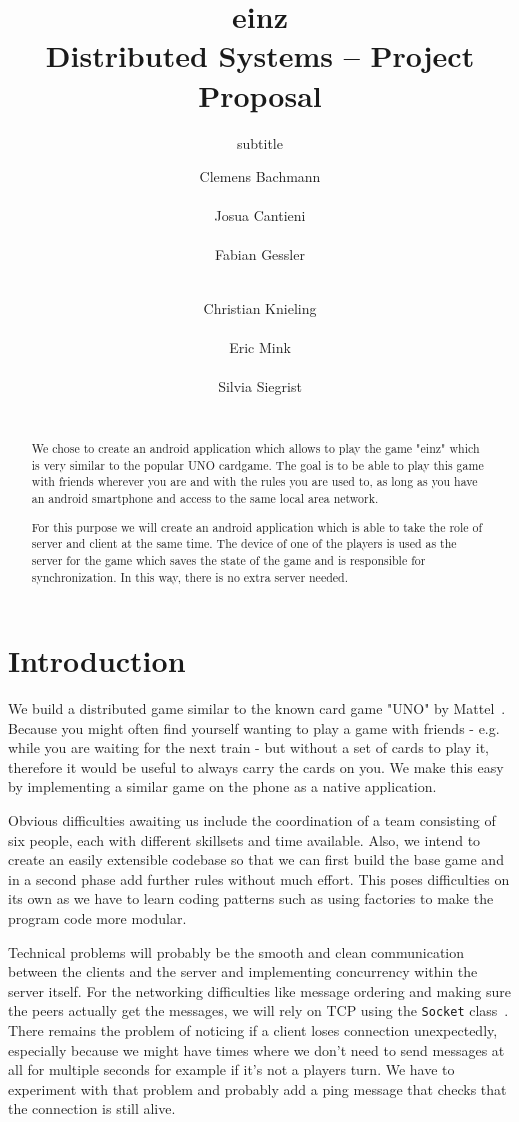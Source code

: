 \documentclass{sig-alternate}
\title{einz\\
\normalsize{Distributed Systems -- Project Proposal}}
\subtitle{subtitle}
\author{
\alignauthor
\normalsize{Clemens Bachmann}\\
	\affaddr{\normalsize{13-932-488}}\\
	\email{\normalsize{baclemen@student.ethz.ch}}
%
\alignauthor
\normalsize{Josua Cantieni}\\
	\affaddr{\normalsize{15-919-038}}\\
	\email{\normalsize{josuac@student.ethz.ch}}
%
\alignauthor
\normalsize{Fabian Gessler}\\
	\affaddr{\normalsize{15-939-341}}\\
	\email{\normalsize{fgessler@student.ethz.ch}}
\and
\alignauthor
\normalsize{Christian Knieling}\\
	\affaddr{\normalsize{ 14-923-809}}\\
	\email{\normalsize{knielinc@student.ethz.ch}}
%
\alignauthor
\normalsize{Eric Mink}\\
	\affaddr{\normalsize{15-917-057}}\\
	\email{\normalsize{minker@student.ethz.ch}}
%
\alignauthor
\normalsize{Silvia Siegrist}\\
	\affaddr{\normalsize{15-935-893}}\\
	\email{\normalsize{sisilvia@student.ethz.ch}}
}
\begin{document}
\maketitle

\begin{abstract}
We chose to create an android application which allows to play the game "einz" which is very similar to the popular UNO cardgame. The goal is to be able to play this game with friends wherever you are and with the rules you are used to, as long as you have an android smartphone and access to the same local area network.

For this purpose we will create an android application which is able to take the role of server and client at the same time. The device of one of the players is used as the server for the game which saves the state of the game and is responsible for synchronization. In this way, there is no extra server needed.
\end{abstract}

\section{Introduction}
We build a distributed game similar to the known card game "UNO" by Mattel~\cite{unoshop}. Because you might often find yourself wanting to play a game with friends - e.g. while you are waiting for the next train - but without a set of cards to play it, therefore it would be useful to always carry the cards on you. We make this easy by implementing a similar game on the phone as a native application.

Obvious difficulties awaiting us include the coordination of a team consisting of six people, each with different skillsets and time available.
Also, we intend to create an easily extensible codebase so that we can first build the base game and in a second phase add further rules without much effort. This poses difficulties on its own as we have to learn coding patterns such as using factories to make the program code more modular.

Technical problems will probably be the smooth and clean communication between the clients and the server and implementing concurrency within the server itself. For the networking difficulties like message ordering and making sure the peers actually get the messages, we will rely on TCP using the \verb|Socket| class~\cite{socketdoc}. There remains the problem of noticing if a client loses connection unexpectedly, especially because we might have times where we don't need to send messages at all for multiple seconds for example if it's not a players turn. We have to experiment with that problem and probably add a ping message that checks that the connection is still alive.
\end{document}
